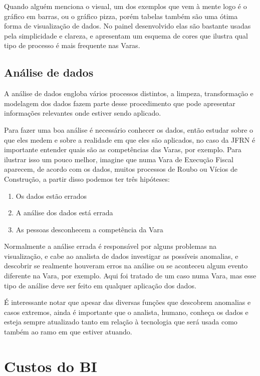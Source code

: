 Quando alguém menciona o visual, um dos exemplos que vem à mente logo é o gráfico em barras, ou o gráfico pizza, porém tabelas também são uma ótima forma de visualização de dados. No painel desenvolvido elas são bastante usadas pela simplicidade e clareza, e apresentam um esquema de cores que ilustra qual tipo de processo é mais frequente nas Varas.

\subsection{Análise de dados}

A análise de dados engloba vários processos distintos, a limpeza, transformação e modelagem dos dados fazem parte desse procedimento que pode apresentar informações relevantes onde estiver sendo aplicado. 

Para fazer uma boa análise é necessário conhecer os dados, então estudar sobre o que eles medem e sobre a realidade em que eles são aplicados, no caso da JFRN é importante entender quais são as competências das Varas, por exemplo. Para ilustrar isso um pouco melhor, imagine que numa Vara de Execução Fiscal aparecem, de acordo com os dados, muitos processos de Roubo ou Vícios de Construção, a partir disso podemos ter três hipóteses:

\begin{enumerate}
	\item Os dados estão errados
	\item A análise dos dados está errada
	\item As pessoas desconhecem a competência da Vara
\end{enumerate}

Normalmente a análise errada é responsável por alguns problemas na visualização, e cabe ao analista de dados investigar as possíveis anomalias, e descobrir se realmente houveram erros na análise ou se aconteceu algum evento diferente na Vara, por exemplo. Aqui foi tratado de um caso numa Vara, mas esse tipo de análise deve ser feito em qualquer aplicação dos dados.

É interessante notar que apesar das diversas funções que descobrem anomalias e casos extremos, ainda é importante que o analista, humano, conheça os dados e esteja sempre atualizado tanto em relação à tecnologia que será usada como também ao ramo em que estiver atuando.


\section{Custos do BI}


